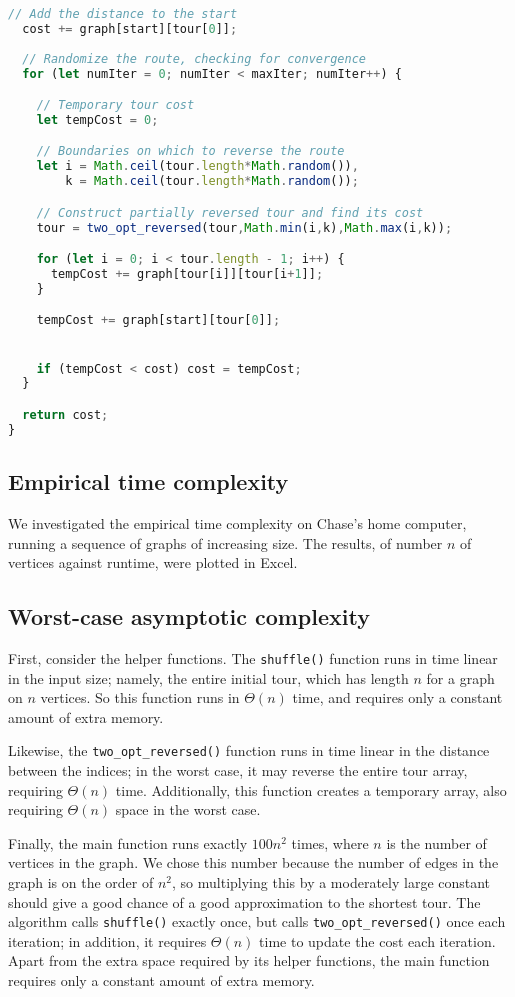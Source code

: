 \documentclass[10pt]{extarticle}
\begin{document}
\begin{lstlisting}[language=JavaScript]
  // Add the distance to the start
  cost += graph[start][tour[0]];
  
  // Randomize the route, checking for convergence
  for (let numIter = 0; numIter < maxIter; numIter++) {

    // Temporary tour cost
    let tempCost = 0;

    // Boundaries on which to reverse the route
    let i = Math.ceil(tour.length*Math.random()),
        k = Math.ceil(tour.length*Math.random());

    // Construct partially reversed tour and find its cost
    tour = two_opt_reversed(tour,Math.min(i,k),Math.max(i,k));

    for (let i = 0; i < tour.length - 1; i++) {
      tempCost += graph[tour[i]][tour[i+1]];
    }

    tempCost += graph[start][tour[0]];


    if (tempCost < cost) cost = tempCost;
  }

  return cost;
}
\end{lstlisting}


\subsection{Empirical time complexity}
We investigated the empirical time complexity on Chase's home computer,
running a sequence of graphs of increasing size. The results, of number
$n$ of vertices against runtime, were plotted in Excel.

\subsection{Worst-case asymptotic complexity}
First, consider the helper functions. The \verb|shuffle()| function runs in time
linear in the input size; namely, the entire initial tour, which has length $n$
for a graph on $n$ vertices. So this function runs in $\Theta(n)$ time, and 
requires only a constant amount of extra memory.

Likewise, the \verb|two_opt_reversed()| function runs in time linear in the
distance between the indices; in the worst case, it may reverse the entire 
tour array, requiring $\Theta(n)$ time. Additionally, this function creates a
temporary array, also requiring $\Theta(n)$ space in the worst case.

Finally, the main function runs exactly $100 n^2$ times, where $n$ is the 
number of vertices in the graph. We chose this number because the number of 
edges in the graph is on the order of $n^2$, so multiplying this by a moderately
large constant should give a good chance of a good approximation to the shortest
tour. The algorithm calls \verb|shuffle()| exactly once, but calls
\verb|two_opt_reversed()| once each iteration; in addition, it requires 
$\Theta(n)$ time to update the cost each iteration. Apart from the extra space
required by its helper functions, the main function requires only a constant 
amount of extra memory.
\end{document}
